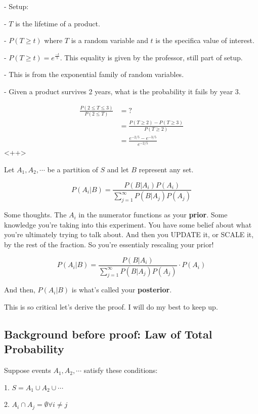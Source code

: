 \documentclass[a4paper]{article}
\begin{document}
- Setup:

- $T$ is the lifetime of a product.

- $P(T \geq t)$ where $T$ is a random variable and $t$ is the specifica value of interest.

- $P(T \geq t) = e^{\frac{-t}{5}}$. This equality is given by the professor, still part of setup.

- This is from the exponential family of random variables.

- Given a product survives 2 years, what is the probability it fails by year 3. 

\begin{align*}
	\frac{P(2 \leq T \leq 3)}{P(2 \leq T)} &= ? \\
	&= \frac{P(T \geq 2) - P(T \geq 3)}{P(T \geq 2)} \\
	&= \frac{e^{-2/5} - e^{-3/5}}{e^{-2/5}}
\end{align*}<++>

\pagebreak

\begin{theorem}
	Let $A_1, A_2, \cdots$ be a partition of $S$ and let $B$ represent any set.

	\[P(A_i | B) = \frac{P(B | A_i) P(A_i)}{\sum_{j=1}^{\infty}P(B|A_j)P(A_j)}\]
\end{theorem}

Some thoughts. The $A_i$ in the numerator functions as your \textbf{prior}. Some knowledge you're taking into this experiment. You have some belief about what you're ultimately trying to talk about. And then you UPDATE it, or SCALE it, by the rest of the fraction. So you're essentialy rescaling your prior!


\[P(A_i | B) = \frac{P(B | A_i)}{\sum_{j=1}^{\infty}P(B|A_j)P(A_j)} \cdot P(A_i)\]

And then, $P(A_i | B)$ is what's called your \textbf{posterior}. 

This is so critical let's derive the proof. I will do my best to keep up.

\subsection*{Background before proof: Law of Total Probability}

Suppose events $A_1, A_2, \cdots$ satisfy these conditions:

1. $S = A_1 \cup A_2 \cup \cdots$ 

2. $A_i \cap A_j = \emptyset \forall i \neq j$
\end{document}
